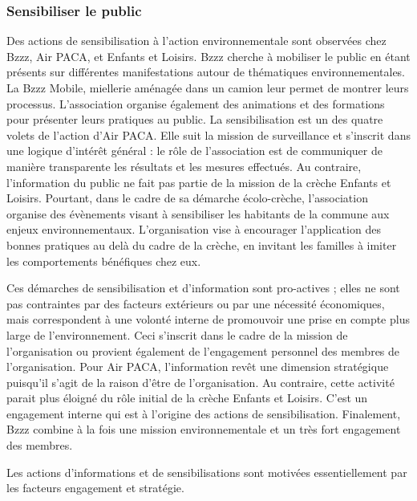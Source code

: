        \subsubsection{Sensibiliser le public}
        Des actions de sensibilisation à l'action environnementale sont observées chez Bzzz, Air PACA, et Enfants et Loisirs. Bzzz cherche à mobiliser le public en étant présents sur différentes manifestations autour de thématiques environnementales. La Bzzz Mobile, miellerie aménagée dans un camion leur permet de montrer leurs processus. L'association organise également des animations et des formations pour présenter leurs pratiques au public. La sensibilisation est un des quatre volets de l'action d'Air PACA. Elle suit la mission de surveillance et s'inscrit dans une logique d'intérêt général : le rôle de l'association est de communiquer de manière transparente les résultats et les mesures effectués. Au contraire, l'information du public ne fait pas partie de la mission de la crèche Enfants et Loisirs. Pourtant, dans le cadre de sa démarche écolo-crèche, l'association organise des évènements visant à sensibiliser les habitants de la commune aux enjeux environnementaux. L'organisation vise à encourager l'application des bonnes pratiques au delà du cadre de la crèche, en invitant les familles à imiter les comportements bénéfiques chez eux. 
        
        Ces démarches de sensibilisation et d'information sont pro-actives ; elles ne sont pas contraintes par des facteurs extérieurs ou par une nécessité économiques, mais correspondent à une volonté interne de promouvoir une prise en compte plus large de l'environnement. Ceci s'inscrit dans le cadre de la mission de l'organisation ou provient également de l'engagement personnel des membres de l'organisation. Pour Air PACA, l'information revêt une dimension stratégique puisqu'il s'agit de la raison d'être de l'organisation. Au contraire, cette activité parait plus éloigné du rôle initial de la crèche Enfants et Loisirs. C'est un engagement interne qui est à l'origine des actions de sensibilisation. Finalement, Bzzz combine à la fois une mission environnementale et un très fort engagement des membres.
        
            \begin{hyp}
            \label{prop:E}
                Les actions d'informations et de sensibilisations sont motivées essentiellement par les facteurs engagement et stratégie.
            \end{hyp}
            
